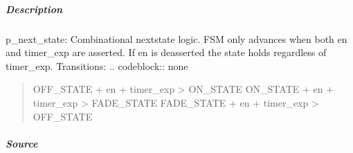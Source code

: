 \documentclass[letterpaper,10pt,english]{sphinxmanual}
\begin{document}
\subparagraph{Description}
\label{\detokenize{modules/blinky/processes/p_next_state:description}}
\sphinxAtStartPar
p\_next\_state: Combinational next\sphinxhyphen{}state logic.
FSM only advances when both en and timer\_exp are asserted.
If en is deasserted the state holds regardless of timer\_exp.
Transitions:
.. code\sphinxhyphen{}block:: none
\begin{quote}

\sphinxAtStartPar
OFF\_STATE  + en + timer\_exp \sphinxhyphen{}\textgreater{} ON\_STATE
ON\_STATE   + en + timer\_exp \sphinxhyphen{}\textgreater{} FADE\_STATE
FADE\_STATE + en + timer\_exp \sphinxhyphen{}\textgreater{} OFF\_STATE
\end{quote}

\noindent{}


\subparagraph{Source}
\label{\detokenize{modules/blinky/processes/p_next_state:source}}
\begin{sphinxVerbatim}[commandchars=\\\{\}]

\end{sphinxVerbatim}
\end{document}
